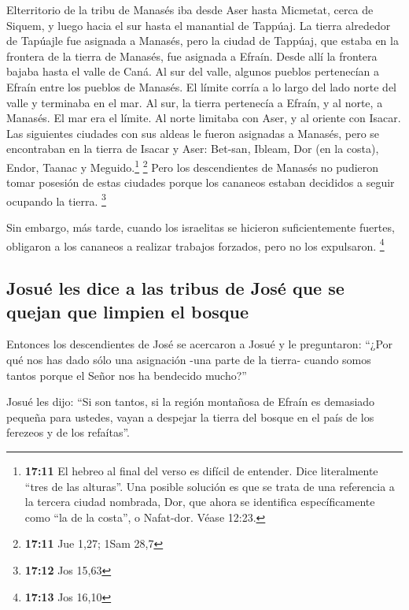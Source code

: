  Elterritorio de la tribu de Manasés iba desde Aser hasta
Micmetat, cerca de Siquem, y luego hacia el sur hasta el manantial de
Tappúaj.  La tierra alrededor de Tapúajle fue asignada a
Manasés, pero la ciudad de Tappúaj, que estaba en la frontera de la
tierra de Manasés, fue asignada a Efraín.  Desde allí la
frontera bajaba hasta el valle de Caná. Al sur del valle, algunos
pueblos pertenecían a Efraín entre los pueblos de Manasés. El límite
corría a lo largo del lado norte del valle y terminaba en el mar.
 Al sur, la tierra pertenecía a Efraín, y al norte, a
Manasés. El mar era el límite. Al norte limitaba con Aser, y al oriente
con Isacar.  Las siguientes ciudades con sus aldeas le
fueron asignadas a Manasés, pero se encontraban en la tierra de Isacar y
Aser: Bet-san, Ibleam, Dor (en la costa), Endor, Taanac y
Meguido.\footnote{\textbf{17:11} El hebreo al final del verso es difícil
  de entender. Dice literalmente ``tres de las alturas''. Una posible
  solución es que se trata de una referencia a la tercera ciudad
  nombrada, Dor, que ahora se identifica específicamente como ``la de la
  costa'', o Nafat-dor. Véase 12:23.} \footnote{\textbf{17:11} Jue 1,27;
  1Sam 28,7}  Pero los descendientes de Manasés no
pudieron tomar posesión de estas ciudades porque los cananeos estaban
decididos a seguir ocupando la tierra. \footnote{\textbf{17:12} Jos
  15,63}

 Sin embargo, más tarde, cuando los israelitas se
hicieron suficientemente fuertes, obligaron a los cananeos a realizar
trabajos forzados, pero no los expulsaron. \footnote{\textbf{17:13} Jos
  16,10}

\hypertarget{josuuxe9-les-dice-a-las-tribus-de-josuxe9-que-se-quejan-que-limpien-el-bosque}{%
\subsection{Josué les dice a las tribus de José que se quejan que
limpien el
bosque}\label{josuuxe9-les-dice-a-las-tribus-de-josuxe9-que-se-quejan-que-limpien-el-bosque}}

 Entonces los descendientes de José se acercaron a Josué
y le preguntaron: ``¿Por qué nos has dado sólo una asignación -una parte
de la tierra- cuando somos tantos porque el Señor nos ha bendecido
mucho?''

 Josué les dijo: ``Si son tantos, si la región montañosa
de Efraín es demasiado pequeña para ustedes, vayan a despejar la tierra
del bosque en el país de los ferezeos y de los refaítas''.

